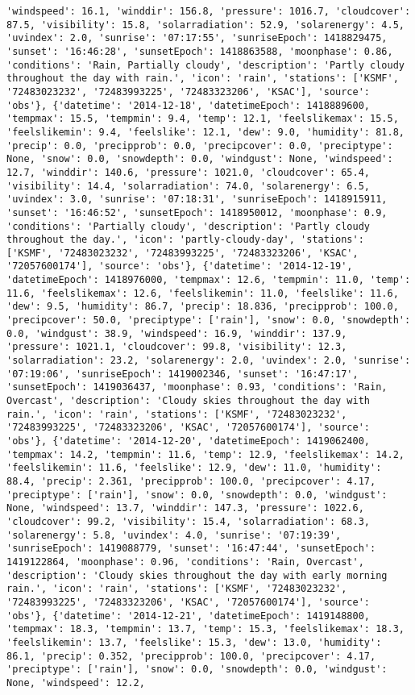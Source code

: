 \documentclass[
  letterpaper,
  DIV=11,
  numbers=noendperiod]{scrartcl}
\begin{document}
\begin{verbatim}
'windspeed': 16.1, 'winddir': 156.8, 'pressure': 1016.7, 'cloudcover': 87.5, 'visibility': 15.8, 'solarradiation': 52.9, 'solarenergy': 4.5, 'uvindex': 2.0, 'sunrise': '07:17:55', 'sunriseEpoch': 1418829475, 'sunset': '16:46:28', 'sunsetEpoch': 1418863588, 'moonphase': 0.86, 'conditions': 'Rain, Partially cloudy', 'description': 'Partly cloudy throughout the day with rain.', 'icon': 'rain', 'stations': ['KSMF', '72483023232', '72483993225', '72483323206', 'KSAC'], 'source': 'obs'}, {'datetime': '2014-12-18', 'datetimeEpoch': 1418889600, 'tempmax': 15.5, 'tempmin': 9.4, 'temp': 12.1, 'feelslikemax': 15.5, 'feelslikemin': 9.4, 'feelslike': 12.1, 'dew': 9.0, 'humidity': 81.8, 'precip': 0.0, 'precipprob': 0.0, 'precipcover': 0.0, 'preciptype': None, 'snow': 0.0, 'snowdepth': 0.0, 'windgust': None, 'windspeed': 12.7, 'winddir': 140.6, 'pressure': 1021.0, 'cloudcover': 65.4, 'visibility': 14.4, 'solarradiation': 74.0, 'solarenergy': 6.5, 'uvindex': 3.0, 'sunrise': '07:18:31', 'sunriseEpoch': 1418915911, 'sunset': '16:46:52', 'sunsetEpoch': 1418950012, 'moonphase': 0.9, 'conditions': 'Partially cloudy', 'description': 'Partly cloudy throughout the day.', 'icon': 'partly-cloudy-day', 'stations': ['KSMF', '72483023232', '72483993225', '72483323206', 'KSAC', '72057600174'], 'source': 'obs'}, {'datetime': '2014-12-19', 'datetimeEpoch': 1418976000, 'tempmax': 12.6, 'tempmin': 11.0, 'temp': 11.6, 'feelslikemax': 12.6, 'feelslikemin': 11.0, 'feelslike': 11.6, 'dew': 9.5, 'humidity': 86.7, 'precip': 18.836, 'precipprob': 100.0, 'precipcover': 50.0, 'preciptype': ['rain'], 'snow': 0.0, 'snowdepth': 0.0, 'windgust': 38.9, 'windspeed': 16.9, 'winddir': 137.9, 'pressure': 1021.1, 'cloudcover': 99.8, 'visibility': 12.3, 'solarradiation': 23.2, 'solarenergy': 2.0, 'uvindex': 2.0, 'sunrise': '07:19:06', 'sunriseEpoch': 1419002346, 'sunset': '16:47:17', 'sunsetEpoch': 1419036437, 'moonphase': 0.93, 'conditions': 'Rain, Overcast', 'description': 'Cloudy skies throughout the day with rain.', 'icon': 'rain', 'stations': ['KSMF', '72483023232', '72483993225', '72483323206', 'KSAC', '72057600174'], 'source': 'obs'}, {'datetime': '2014-12-20', 'datetimeEpoch': 1419062400, 'tempmax': 14.2, 'tempmin': 11.6, 'temp': 12.9, 'feelslikemax': 14.2, 'feelslikemin': 11.6, 'feelslike': 12.9, 'dew': 11.0, 'humidity': 88.4, 'precip': 2.361, 'precipprob': 100.0, 'precipcover': 4.17, 'preciptype': ['rain'], 'snow': 0.0, 'snowdepth': 0.0, 'windgust': None, 'windspeed': 13.7, 'winddir': 147.3, 'pressure': 1022.6, 'cloudcover': 99.2, 'visibility': 15.4, 'solarradiation': 68.3, 'solarenergy': 5.8, 'uvindex': 4.0, 'sunrise': '07:19:39', 'sunriseEpoch': 1419088779, 'sunset': '16:47:44', 'sunsetEpoch': 1419122864, 'moonphase': 0.96, 'conditions': 'Rain, Overcast', 'description': 'Cloudy skies throughout the day with early morning rain.', 'icon': 'rain', 'stations': ['KSMF', '72483023232', '72483993225', '72483323206', 'KSAC', '72057600174'], 'source': 'obs'}, {'datetime': '2014-12-21', 'datetimeEpoch': 1419148800, 'tempmax': 18.3, 'tempmin': 13.7, 'temp': 15.3, 'feelslikemax': 18.3, 'feelslikemin': 13.7, 'feelslike': 15.3, 'dew': 13.0, 'humidity': 86.1, 'precip': 0.352, 'precipprob': 100.0, 'precipcover': 4.17, 'preciptype': ['rain'], 'snow': 0.0, 'snowdepth': 0.0, 'windgust': None, 'windspeed': 12.2, 
\end{verbatim}
\end{document}

